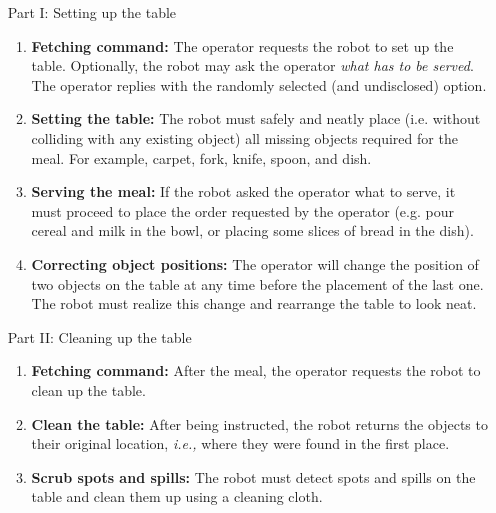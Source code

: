 \begin{itemize}
	\item[Part I:] Setting up the table
	\begin{enumerate}
		\item \textbf{Fetching command:} The operator requests the robot to set up the table. Optionally, the robot may ask the operator \textit{what has to be served}. The operator replies with the randomly selected (and undisclosed) option.

		\item \textbf{Setting the table:} The robot must safely and neatly place (i.e. without colliding with any existing object) all missing objects required for the meal. For example, carpet, fork, knife, spoon, and dish.

		\item \textbf{Serving the meal:} If the robot asked the operator what to serve, it must proceed to place the order requested by the operator (e.g. pour cereal and milk in the bowl, or placing some slices of bread in the dish).

		\item \textbf{Correcting object positions:} The operator will change the position of two objects on the table at any time before the placement of the last one. The robot must realize this change and rearrange the table to look neat.
	\end{enumerate}

	\item[Part II:] Cleaning up the table
	\begin{enumerate}
		\item \textbf{Fetching command:} After the meal, the operator requests the robot to clean up the table.

		\item \textbf{Clean the table:} After being instructed, the robot returns the objects to their original location, \textit{i.e.,} where they were found in the first place.

		\item \textbf{Scrub spots and spills:} The robot must detect spots and spills on the table and clean them up using a cleaning cloth.
	\end{enumerate}
\end{itemize}

